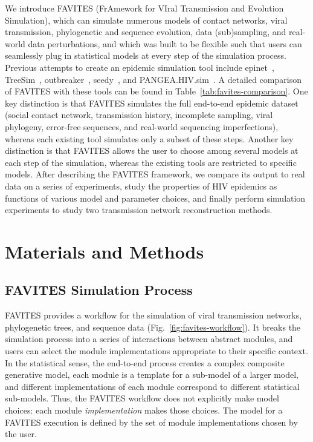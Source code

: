 We introduce FAVITES (FrAmework for VIral Transmission and Evolution Simulation), which can simulate numerous models of contact networks, viral transmission, phylogenetic and sequence evolution, data (sub)sampling, and real-world data perturbations, and which was built to be flexible such that users can seamlessly plug in statistical models at every step of the simulation process. Previous attempts to create an epidemic simulation tool include epinet~\cite{Groendyke2012}, TreeSim~\cite{Stadler2013}, outbreaker~\cite{Jombart2014}, seedy~\cite{Worby2015}, and PANGEA.HIV.sim~\cite{Ratmann2017}. A detailed comparison of FAVITES with these tools can be found in Table~\ref{tab:favites-comparison}. One key distinction is that FAVITES simulates the full end-to-end epidemic dataset (social contact network, transmission history, incomplete sampling, viral phylogeny, error-free sequences, and real-world sequencing imperfections), whereas each existing tool simulates only a subset of these steps. Another key distinction is that FAVITES allows the user to choose among several models at each step of the simulation, whereas the existing tools are restricted to specific models. After describing the FAVITES framework,  we compare its output to real data on a series of experiments, study the properties of \gls{HIV} epidemics as functions of various model and parameter choices, and finally perform simulation experiments to study two transmission network reconstruction methods.

\section{Materials and Methods}
\subsection{FAVITES Simulation Process}\label{sec:favites-process}
FAVITES provides a workflow for the simulation of viral transmission networks, phylogenetic trees, and sequence data (Fig.~\ref{fig:favites-workflow}). It breaks the simulation process into a series of interactions between abstract modules, and users can select the module implementations appropriate to their specific context. In the statistical sense, the end-to-end process creates a complex composite generative model, each module is a template for a sub-model of a larger model, and different implementations of each module correspond to different statistical sub-models. Thus, the FAVITES workflow does not explicitly make model choices: each module \textit{implementation} makes those choices. The model for a FAVITES execution is defined by the set of module implementations chosen by the user.


